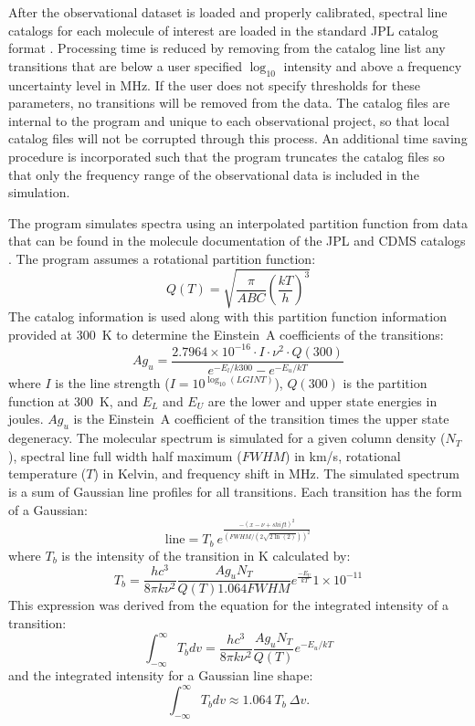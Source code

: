 \documentclass[11pt,twoside]{article}
\begin{document}
After the observational dataset is loaded and properly calibrated, spectral line catalogs for each molecule of interest are loaded in the standard JPL catalog format \citep{Pickett_1998}. Processing time is reduced by removing from the catalog line list any transitions that are below a user specified $\log_{10}$ intensity and above a frequency uncertainty level in MHz.  If the user does not specify thresholds for these parameters, no transitions will be removed from the data.  The catalog files are internal to the program and unique to each observational project, so that local catalog files will not be corrupted through this process.  An additional time saving procedure is incorporated such that the program truncates the catalog files so that only the frequency range of the observational data is included in the simulation.

The program simulates spectra using an interpolated partition function from data that can be found in the molecule documentation of the JPL and CDMS catalogs \citep{Pickett_1998, Muller_2005}.  The program assumes a rotational partition function:
$$Q(T) = \sqrt{\frac{\pi}{ABC}\left(\frac{k T}{h}\right)^3}$$
The catalog information is used along with this partition function information provided at 300~K to determine the Einstein~A coefficients of the transitions:
$$Ag_u = \frac{2.7964\times10^{-16}\cdot I \cdot \nu^2 \cdot Q(300)}{e^{-E_l/k300}- e^{-E_u/kT}}$$
where $I$ is the line strength ($I = 10^{\log_{10}(LGINT)}$), $Q(300)$ is the partition function at 300~K, and $E_L$ and $E_U$ are the lower and upper state energies in joules.  $Ag_u$ is the Einstein~A coefficient of the transition times the upper state degeneracy.  The molecular spectrum is simulated for a given column density ($N_T$), spectral line full width half maximum ($FWHM$) in km/s, rotational temperature ($T$) in Kelvin, and frequency shift in MHz.  The simulated spectrum is a sum of Gaussian line profiles for all transitions.  Each transition has the form of a Gaussian:
$$\text{line} = T_b~e^{\frac{-(x - \nu + shift)^2}{\left(FWHM/\left(2\sqrt{2\ln(2)}\right)\right)^2}}$$
where $T_b$ is the intensity of the transition in K calculated by:
$$T_b = \frac{h c^3}{8\pi k\nu^2}\frac{Ag_u N_T}{Q(T) 1.064 FWHM}e^{\frac{-E_U}{k T}}1\times 10^{-11}$$
This expression was derived from the equation for the integrated intensity of a transition:
$$\int_{-\infty}^{\infty}T_b dv = \frac{h c^3}{8\pi k\nu^2}\frac{Ag_u N_T}{Q(T)}e^{-E_u/k T}$$
\citep{NummelinApJS_1998} and the integrated intensity for a Gaussian line shape:
$$\int_{-\infty}^{\infty}T_b dv \approx 1.064~T_b~\Delta v.$$
\end{document}
